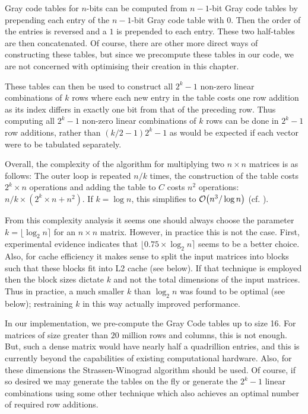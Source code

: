 Gray code tables for $n$-bits can be computed from $n-1$-bit Gray code tables by prepending each entry of the $n-1$-bit Gray code table with $0$. Then the order of the entries is reversed and a $1$ is prepended to each entry. These two half-tables are then concatenated. Of course, there are other more direct ways of constructing these tables, but since we precompute these tables in our code, we are not concerned with optimising their creation in this chapter.

These tables can then be used to construct all $2^k-1$ non-zero linear combinations of $k$ rows where each new entry in the table costs one row addition as its index differs in exactly one bit from that of the preceding row. Thus computing all $2^k-1$ non-zero linear combinations of $k$ rows can be done in $2^k-1$ row additions, rather than $(k/2-1)2^k-1$ as would be expected if each vector were to be tabulated separately.

Overall, the complexity of the algorithm for multiplying two $n \times n$ matrices is as follows: The outer loop is repeated $n/k$ times, the construction of the table costs $2^k \times n$ operations and adding the table to $C$ costs $n^2$ operations: $n/k \times (2^k \times n + n^2)$. If $k= \log n$, this simplifies to $\mathcal{O}\!\left(n^3/\log n\right)$ (cf. \cite{Bard2006}).

From this complexity analysis it seems one should always choose the parameter $k = \lfloor \log_2 n \rceil$ for an $n \times n$ matrix. However, in practice this  is not the case. First, experimental evidence indicates \cite[Ch. 5]{bard-phd} that  $\lfloor 0.75 \times \log_2 n \rceil$ seems to be a better choice. Also, for cache  efficiency it makes sense to split the input matrices into blocks such that  these blocks fit into L2 cache (see below). If that technique is employed  then the block sizes dictate $k$ and not the total dimensions of the input matrices.  Thus in practice, a much smaller $k$ than $\log_2 n$ was found to be optimal (see below); restraining $k$ in this way actually improved performance.

In our implementation, we pre-compute the Gray Code tables up to size 16. For matrices of size greater than $20$ million rows and columns, this is not enough. But, such a dense matrix would have nearly half a quadrillion entries, and this is currently beyond the capabilities of existing computational hardware. Also, for these dimensions the Strassen-Winograd algorithm should be used. Of course, if so desired we may generate the tables on the fly or generate the $2^k - 1$ linear combinations using some other technique which also achieves an optimal number of required row additions.

